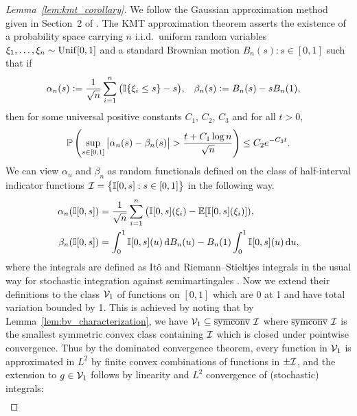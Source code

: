 \begin{proof}[Lemma~\ref{lem:kmt_corollary}]

  We follow the Gaussian approximation method given in
  Section~2 of \citet{gine2004kernel}.
  The KMT approximation theorem \citep{komlos1975approximation}
  asserts the existence
  of a probability space
  carrying $n$ i.i.d.\ uniform random variables
  $\xi_1, \ldots, \xi_n \sim \Unif[0,1]$
  and a standard Brownian motion
  $B_n(s): s \in [0,1]$
  such that if
  \begin{align*}
    \alpha_n(s)
    &\vcentcolon=
    \frac{1}{\sqrt{n}}
    \sum_{i=1}^n
    \big(
    \I\{\xi_i \leq s\} - s
    \big),
    &\beta_n(s)
    &\vcentcolon=
    B_n(s) - s B_n(1),
  \end{align*}
  then
  for some universal positive constants
  $C_1$, $C_2$, $C_3$
  and for all $t > 0$,
  \begin{align*}
    \P\left(
      \sup_{s \in [0,1]}
      \big| \alpha_n(s) - \beta_n(s) \big|
      > \frac{t + C_1\log n}{\sqrt{n}}
    \right)
    \leq C_2 e^{-C_3 t}.
  \end{align*}
  We can
  view $\alpha_n$ and $\beta_n$ as random functionals
  defined on the class of
  half-interval indicator functions
  $\cI = \big\{\I[0,s]: s \in [0,1]\big\}$
  in the following way.
  \begin{align*}
    \alpha_n(\I[0,s])
    &= \frac{1}{\sqrt{n}}
    \sum_{i=1}^n
    \big( \I[0,s](\xi_i) - \E[\I[0,s](\xi_i)]), \\
    \beta_n(\I[0,s])
    &= \int_0^1 \I[0,s](u) \diff{B_n(u)}
    - B_n(1) \int_0^1 \I[0,s](u) \diff{u},
  \end{align*}
  where the integrals are defined as It\^o and
  Riemann--Stieltjes integrals in
  the usual way for stochastic integration against semimartingales
  \citep[Chapter~5]{legall2016brownian}.
  Now we extend their definitions to the class
  $\cV_1$
  of functions on $[0,1]$
  which are 0 at 1 and have total variation bounded by 1.
  This is achieved by
  noting that by Lemma~\ref{lem:bv_characterization},
  we have
  $\cV_1 \subseteq \overline\symconv \ \cI$
  where $\overline{\symconv} \ \cI$ is the
  smallest
  symmetric convex class containing $\cI$
  which is closed under pointwise convergence.
  Thus by the dominated convergence theorem,
  every function in $\cV_1$ is approximated in $L^2$ by finite convex
  combinations of functions in $\pm\cI$,
  and the extension to $g \in \cV_1$ follows
  by linearity and $L^2$ convergence of (stochastic) integrals:
  \begin{align*}

\end{align*}
\end{proof}
